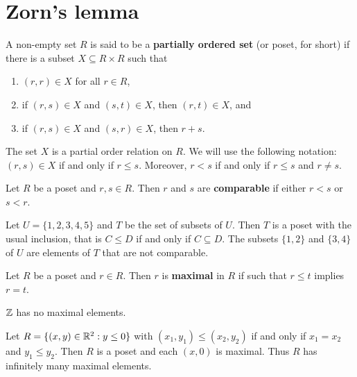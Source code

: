 \chapter{Zorn's lemma}

\begin{definition}
A non-empty set $R$ is said to be a \textbf{partially ordered set} (or poset, for short) 
if there is a subset $X\subseteq R\times R$ such that
\begin{enumerate}
    \item $(r,r)\in X$ for all $r\in R$, 
    \item if $(r,s)\in X$ and $(s,t)\in X$, then $(r,t)\in X$, and 
    \item if $(r,s)\in X$ and $(s,r)\in X$, then $r+s$. 
\end{enumerate}
\end{definition}

The set $X$ is a partial order relation on $R$.  
We will use the following notation: $(r,s)\in X$ if and only if $r\leq s$. Moreover, 
$r<s$ if and only if $r\leq s$ and $r\ne s$. 

\begin{definition}
Let $R$ be a poset and $r,s\in R$. Then $r$ and $s$ are \textbf{comparable}
if either $r<s$ or $s<r$.
\end{definition}

\begin{example}
Let $U=\{1,2,3,4,5\}$ and $T$ be the set of subsets of $U$. Then $T$ is a poset
with the usual inclusion, that is $C\leq D$ if and only if $C\subseteq D$. The subsets
$\{1,2\}$ and $\{3,4\}$ of $U$ are elements of $T$ that are not comparable. 
\end{example}

\begin{definition}
    Let $R$ be a poset and $r\in R$. Then $r$ is \textbf{maximal} in $R$ if 
    such that $r\leq t$ implies $r=t$. 
\end{definition}

\begin{example}
$\mathbb{Z}$ has no maximal elements. 
\end{example}

\begin{example}
Let $R=\{(x,y)\in\mathbb{R}^2:y\leq0\}$ with $(x_1,y_1)\leq(x_2,y_2)$ if and only if $x_1=x_2$ and $y_1\leq y_2$. Then
$R$ is a poset and each $(x,0)$ is maximal. Thus $R$ has infinitely many maximal elements.
\end{example}

